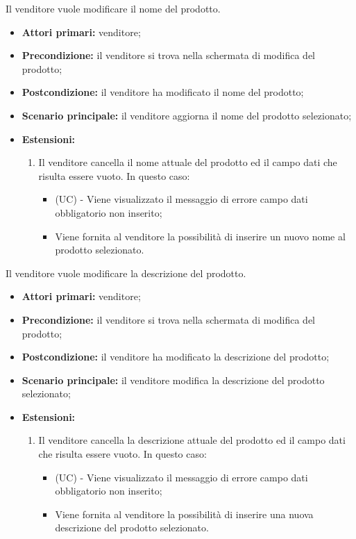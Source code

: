 \resetSubUC
{}
Il venditore vuole modificare il nome del prodotto.
\begin{itemize}
    \item \textbf{Attori primari:} venditore;
    \item \textbf{Precondizione:} il venditore si trova nella schermata di modifica del prodotto;
    \item \textbf{Postcondizione:} il venditore ha modificato il nome del prodotto;
    \item \textbf{Scenario principale:} il venditore aggiorna il nome del prodotto selezionato;
    \item \textbf{Estensioni:}
    \begin{enumerate}[label=\lett]
    	\item Il venditore cancella il nome attuale del prodotto ed il campo dati che risulta essere vuoto. In questo caso:
    	\begin{itemize}
    		\item (UC) - Viene visualizzato il messaggio di errore campo dati obbligatorio non inserito;
    		\item Viene fornita al venditore la possibilità di inserire un nuovo nome al prodotto selezionato.
    	\end{itemize}
    \end{enumerate}
\end{itemize}

Il venditore vuole modificare la descrizione del prodotto.
\begin{itemize}
    \item \textbf{Attori primari:} venditore;
    \item \textbf{Precondizione:} il venditore si trova nella schermata di modifica del prodotto;
    \item \textbf{Postcondizione:} il venditore ha modificato la descrizione del prodotto;
    \item \textbf{Scenario principale:} il venditore modifica la descrizione del prodotto selezionato;
    \item \textbf{Estensioni:}
    \begin{enumerate}[label=\lett]
    	\item Il venditore cancella la descrizione attuale del prodotto ed il campo dati che risulta essere vuoto. In questo caso:
    	\begin{itemize}
    		\item (UC) - Viene visualizzato il messaggio di errore campo dati obbligatorio non inserito;
    		\item Viene fornita al venditore la possibilità di inserire una nuova descrizione del prodotto selezionato.
    	\end{itemize}
    \end{enumerate}
\end{itemize}

